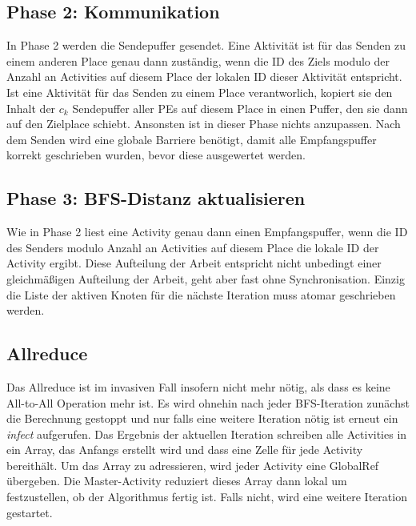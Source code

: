 \subsection{Phase 2: Kommunikation} %
\label{sub:parallel_phase_2_invasive}
In Phase 2 werden die Sendepuffer gesendet. Eine Aktivität ist für das Senden zu einem anderen Place genau dann zuständig, wenn die ID des Ziels modulo der Anzahl an Activities auf diesem Place der lokalen ID dieser Aktivität entspricht. Ist eine Aktivität für das Senden zu einem Place verantworlich, kopiert sie den Inhalt der $c_k$ Sendepuffer aller PEs auf diesem Place in einen Puffer, den sie dann auf den Zielplace schiebt. Ansonsten ist in dieser Phase nichts anzupassen. Nach dem Senden wird eine globale Barriere benötigt, damit alle Empfangspuffer korrekt geschrieben wurden, bevor diese ausgewertet werden.

\subsection{Phase 3: BFS-Distanz aktualisieren} %
\label{sub:phase_3_invasive}
Wie in Phase 2 liest eine Activity genau dann einen Empfangspuffer, wenn die ID des Senders modulo Anzahl an Activities auf diesem Place die lokale ID der Activity ergibt. Diese Aufteilung der Arbeit entspricht nicht unbedingt einer gleichmäßigen Aufteilung der Arbeit, geht aber fast ohne Synchronisation. Einzig die Liste der aktiven Knoten für die nächste Iteration muss atomar geschrieben werden.

\subsection{Allreduce} %
\label{sub:allreduce_invasive}
Das Allreduce ist im invasiven Fall insofern nicht mehr nötig, als dass es keine All-to-All Operation mehr ist. Es wird ohnehin nach jeder BFS-Iteration zunächst die Berechnung gestoppt und nur falls eine weitere Iteration nötig ist erneut ein \textit{infect} aufgerufen. Das Ergebnis der aktuellen Iteration schreiben alle Activities in ein Array, das Anfangs erstellt wird und dass eine Zelle für jede Activity bereithält. Um das Array zu adressieren, wird jeder Activity eine GlobalRef übergeben. Die Master-Activity reduziert dieses Array dann lokal um festzustellen, ob der Algorithmus fertig ist. Falls nicht, wird eine weitere Iteration gestartet.

